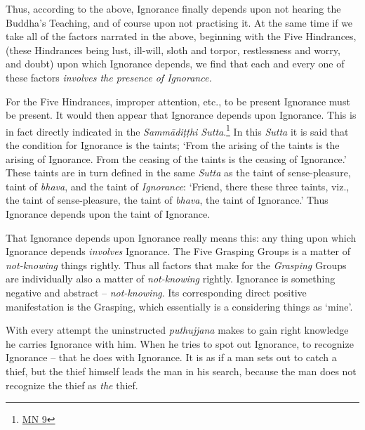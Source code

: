 Thus, according to the above, Ignorance finally depends upon not hearing the Buddha's Teaching, and of course upon not practising it. At the same time if we take all of the factors narrated in the above, beginning with the Five Hindrances, (these Hindrances being lust, ill-will, sloth and torpor, restlessness and worry, and doubt) upon which Ignorance depends, we find that each and every one of these factors \emph{involves the presence of Ignorance.}

For the Five Hindrances, improper attention, etc., to be present Ignorance must be present. It would then appear that Ignorance depends upon Ignorance. This is in fact directly indicated in the \textit{Sammādiṭṭhi Sutta}.\footnote{\href{https://suttacentral.net/mn9/en/bodhi}{MN 9}} In this \textit{Sutta} it is said that the condition for Ignorance is the taints; `From the arising of the taints is the arising of Ignorance. From the ceasing of the taints is the ceasing of Ignorance.' These taints are in turn defined in the same \textit{Sutta} as the taint of sense-pleasure, taint of \textit{bhava}, and the taint of \emph{Ignorance}: `Friend, there these three taints, viz., the taint of sense-pleasure, the taint of \textit{bhava}, the taint of Ignorance.' Thus Ignorance depends upon the taint of Ignorance.

That Ignorance depends upon Ignorance really means this: any thing upon which Ignorance depends \emph{involves} Ignorance. The Five Grasping Groups is a matter of \emph{not-knowing} things rightly. Thus all factors that make for the \emph{Grasping} Groups are individually also a matter of \emph{not-knowing} rightly. Ignorance is something negative and abstract -- \emph{not-knowing}. Its corresponding direct positive manifestation is the Grasping, which essentially is a considering things as `mine'.

With every attempt the uninstructed \textit{puthujjana} makes to gain right knowledge he carries Ignorance with him. When he tries to spot out Ignorance, to recognize Ignorance -- that he does with Ignorance. It is as if a man sets out to catch a thief, but the thief himself leads the man in his search, because the man does not recognize the thief as \emph{the} thief.

